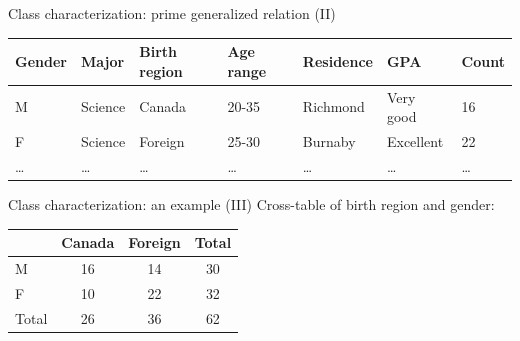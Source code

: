 \documentclass[aspectratio=169,t]{beamer}
\begin{document}
  { 
    \begin{frame}{Class characterization: prime generalized relation (II)}
    \begin{table}
    \begin{tabularx}{\textwidth}{|X|X|X|X|X|X|X|}
    \hline
    \textbf{Gender} & \textbf{Major} & \textbf{Birth region} & \textbf{Age range} & \textbf{Residence} & \textbf{GPA} & \textbf{Count} \\\hline
    M & Science & Canada & 20-35 & Richmond & Very good & 16 \\\hline
    F & Science & Foreign & 25-30 & Burnaby & Excellent & 22 \\\hline
    \ldots & \ldots & \ldots & \ldots & \ldots & \ldots & \ldots \\
    \hline
    \end{tabularx}
    \end{table}
    \end{frame}
  }

  { 
    \begin{frame}{Class characterization: an example (III)}
    \centering
    Cross-table of birth region and gender:\\[0.5cm]
    \begin{tabular}{|l|c|c|c|}
    \hline
    & Canada & Foreign & Total \\\hline
    M & 16 & 14 & 30 \\\hline
    F & 10 & 22 & 32 \\\hline
    Total & 26 & 36 & 62 \\\hline
    \end{tabular}
    \end{frame}
  }
\end{document}
